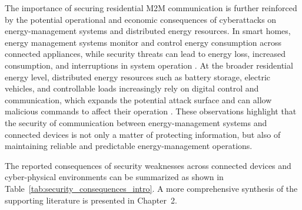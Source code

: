 The importance of securing residential M2M communication is further reinforced by the potential operational and economic consequences of cyberattacks on energy-management systems and distributed energy resources. In smart homes, energy management systems monitor and control energy consumption across connected appliances, while security threats can lead to energy loss, increased consumption, and interruptions in system operation \cite{alkatheiriCyberSecurityFramework2021}. At the broader residential energy level, distributed energy resources such as battery storage, electric vehicles, and controllable loads increasingly rely on digital control and communication, which expands the potential attack surface and can allow malicious commands to affect their operation \cite{zografopoulosDistributedEnergyResources2023}. These observations highlight that the security of communication between energy-management systems and connected devices is not only a matter of protecting information, but also of maintaining reliable and predictable energy-management operations.


The reported consequences of security weaknesses across connected devices and cyber-physical environments can be summarized as shown in Table~\ref{tab:security_consequences_intro}. A more comprehensive synthesis of the supporting literature is presented in Chapter~2.

